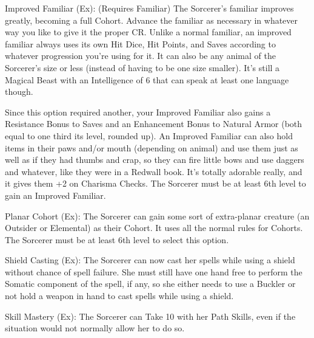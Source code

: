 \begin{description*}
\item[Improved Familiar (Ex):] (Requires Familiar) The Sorcerer's familiar improves greatly, becoming a full Cohort. Advance the familiar as necessary in whatever way you like to give it the proper CR. Unlike a normal familiar, an improved familiar always uses its own Hit Dice, Hit Points, and Saves according to whatever progression you're using for it. It can also be any animal of the Sorcerer's size or less (instead of having to be one size smaller). It's still a Magical Beast with an Intelligence of 6 that can speak at least one language though.

Since this option required another, your Improved Familiar also gains a Resistance Bonus to Saves and an Enhancement Bonus to Natural Armor (both equal to one third its level, rounded up). An Improved Familiar can also hold items in their paws and/or mouth (depending on animal) and use them just as well as if they had thumbs and crap, so they can fire little bows and use daggers and whatever, like they were in a Redwall book. It's totally adorable really, and it gives them +2 on Charisma Checks. The Sorcerer must be at least 6th level to gain an Improved Familiar.

\item[Planar Cohort (Ex):] The Sorcerer can gain some sort of extra-planar creature (an Outsider or Elemental) as their Cohort. It uses all the normal rules for Cohorts. The Sorcerer must be at least 6th level to select this option.

\item[Shield Casting (Ex):] The Sorcerer can now cast her spells while using a shield without chance of spell failure. She must still have one hand free to perform the Somatic component of the spell, if any, so she either needs to use a Buckler or not hold a weapon in hand to cast spells while using a shield.

\item[Skill Mastery (Ex):] The Sorcerer can Take 10 with her Path Skills, even if the situation would not normally allow her to do so.

\end{description*}

